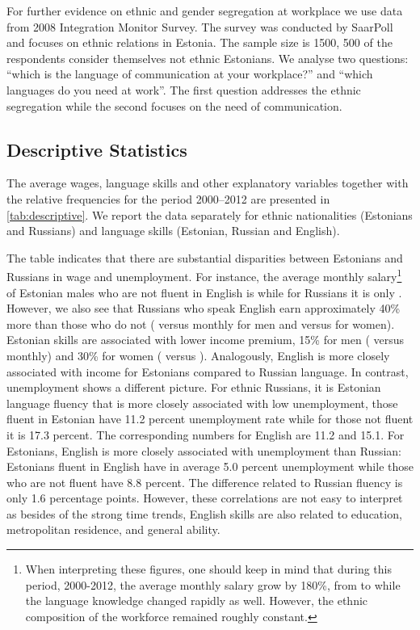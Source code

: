 \documentclass[12pt, a4paper]{article}
\begin{document}
For further evidence on ethnic and gender segregation at workplace we use data
from 2008 Integration Monitor Survey.  The survey was conducted by
SaarPoll and focuses on
ethnic relations in Estonia.  The sample size is 1500,
500 of the respondents consider themselves not ethnic Estonians.  We analyse
two questions: ``which is the language of communication at your
workplace?'' and ``which languages do you need at work''.  The first
question addresses the ethnic segregation while the second focuses on
the need of communication.


\subsection{Descriptive Statistics}
\label{sec:descriptive}

The average wages, language skills and other explanatory variables together with the relative frequencies for the period 2000--2012 are presented in \cref{tab:descriptive}. We report the data separately for ethnic nationalities (Estonians and Russians) and language
skills (Estonian, Russian and English).

The table indicates that there are substantial disparities between
Estonians and Russians in wage and unemployment. For instance, the
average monthly salary\footnote{When interpreting these figures,
  one should keep in mind that during this period, 2000-2012, the average monthly salary grow by 180\%,
  from  to  while the language knowledge changed rapidly as
  well.  However, the ethnic composition of the workforce remained
  roughly constant.} of Estonian
males who are not fluent in English is  while for Russians it
is only . However, we also see that Russians who speak
English earn approximately 40\% more than those who do not (
versus  monthly for men and  versus  for
women). Estonian skills are associated with lower income premium, 15\%
for men ( versus  monthly) and 30\% for women
( versus ).  Analogously, English is more closely
associated with income for Estonians compared to Russian language. In
contrast, unemployment shows a different picture. For ethnic Russians,
it is Estonian language fluency that is more closely associated with
low unemployment, those fluent in Estonian have 11.2 percent
unemployment rate while for those not fluent it is 17.3 percent.  The
corresponding numbers for English are 11.2 and 15.1.  For Estonians,
English is more closely associated with unemployment than Russian:
Estonians fluent in English have in average 5.0 percent unemployment
while those who are not fluent have 8.8 percent.  The difference
related to Russian fluency is only 1.6 percentage points.  However,
these correlations are not easy to interpret as besides of the strong
time trends, English skills are
also related to education, metropolitan residence, and general
ability.
\end{document}
